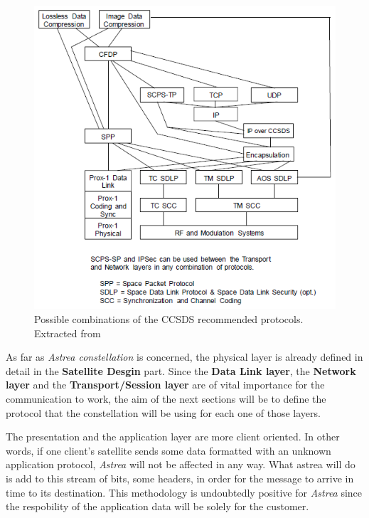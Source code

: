 \begin{figure}[H]
\begin{center}
\includegraphics[scale=0.6]{SpaceSegment/Layer3/CCSDScombinations.png}
\caption[Possible combinations of the CCSDS protocols]{Possible combinations of the CCSDS recommended protocols. Extracted from \cite{CCSDSOverview}}
\end{center}
\end{figure}

As far as \textit{Astrea constellation} is concerned, the physical layer is already defined in detail in the \textbf{Satellite Desgin} part. Since the\textbf{ Data Link layer}, the \textbf{Network layer} and the \textbf{Transport/Session layer} are of vital importance for the communication to work, the aim of the next sections will be to define the protocol that the constellation will be using for each one of those layers.

The presentation and the application layer are more client oriented. In other words, if one client's satellite sends some data formatted with an unknown application protocol, \textit{Astrea} will not be affected in any way. What astrea will do is add to this stream of bits, some headers, in order for the message to arrive in time to its destination. This methodology is undoubtedly positive for \textit{Astrea} since the respobility of the application data will be solely for the customer.